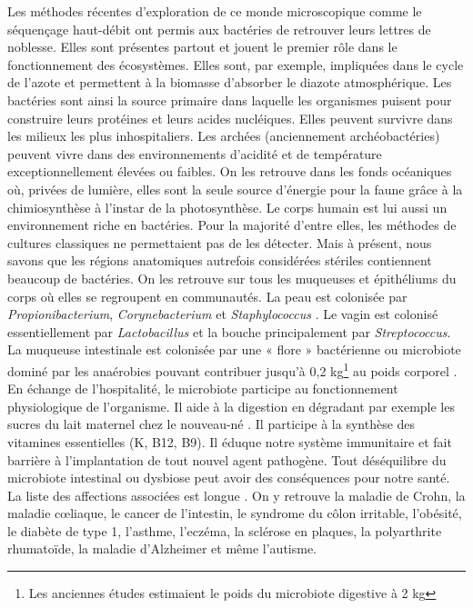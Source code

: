 \documentclass[12pt,a4paper]{article}
\begin{document}
Les méthodes récentes d'exploration de ce monde microscopique comme le séquençage haut-débit ont permis aux bactéries de retrouver leurs lettres de noblesse.
Elles sont présentes partout et jouent le premier rôle dans le fonctionnement des écosystèmes. Elles sont, par exemple, impliquées dans le cycle de l'azote et permettent à la biomasse d'absorber le diazote atmosphérique. Les bactéries sont ainsi la source primaire dans laquelle les organismes puisent pour construire leurs protéines et leurs acides nucléiques.
Elles peuvent survivre dans les milieux les plus inhospitaliers. Les archées (anciennement archéobactéries) peuvent vivre dans des environnements d'acidité et de température exceptionnellement élevées ou faibles. On les retrouve dans les fonds océaniques où, privées de lumière, elles sont la seule source d'énergie pour la faune grâce à la chimiosynthèse à l'instar de la photosynthèse.
Le corps humain est lui aussi un environnement riche en bactéries. Pour la majorité d'entre elles, les méthodes de cultures classiques ne permettaient pas de les détecter. Mais à présent, nous savons que les régions anatomiques autrefois considérées stériles contiennent beaucoup de bactéries.
On les retrouve sur tous les muqueuses et épithéliums du corps où elles se regroupent en communautés.
La peau est colonisée par \textit{Propionibacterium}, \textit{Corynebacterium} et \textit{Staphylococcus} \cite{Yong2017}. Le vagin est colonisé essentiellement par \textit{Lactobacillus} et la bouche principalement par \textit{Streptococcus}\cite{Yong2017}.
La muqueuse intestinale est colonisée par une « flore » bactérienne ou microbiote dominé par les anaérobies pouvant contribuer jusqu'à 0,2 kg\footnote{Les anciennes études estimaient le poids du microbiote digestive à 2 kg} au poids corporel \citep{Sender2016}.
En échange de l'hospitalité, le microbiote participe au fonctionnement physiologique de l'organisme. Il aide à la digestion en dégradant par exemple les sucres du lait maternel chez le nouveau-né \cite{Bode2012,Yong2017}. Il participe à la synthèse des vitamines essentielles (K, B12, B9)\cite{LeBlanc2013,Yong2017}. Il éduque notre système immunitaire et fait barrière à l'implantation de tout nouvel agent pathogène.
Tout déséquilibre du microbiote intestinal ou dysbiose peut avoir des conséquences pour notre santé. La liste des affections associées est longue \cite{Yong2017}. On y retrouve la maladie de Crohn, la maladie cœliaque, le cancer de l’intestin, le syndrome du côlon irritable, l’obésité, le diabète de type 1, l’asthme, l’eczéma, la sclérose en plaques, la polyarthrite rhumatoïde, la maladie d’Alzheimer et même l’autisme. \\
\end{document}
